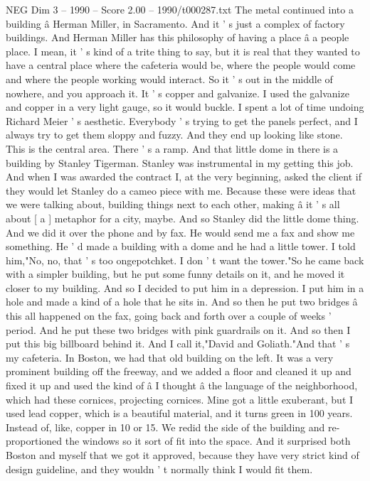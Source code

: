 \begin{textsample}{NEG Dim 3 – 1990 – Score 2.00 – 1990/t000287.txt}
The metal continued into a building â Herman Miller, in Sacramento.
And it ' s just a complex of factory buildings.
And Herman Miller has this philosophy of having a place â a people place.
I mean, it ' s kind of a trite thing to say, but it is real that they wanted to have a central place where the cafeteria would be, where the people would come and where the people working would interact.
So it ' s out in the middle of nowhere, and you approach it.
It ' s copper and galvanize.
I used the galvanize and copper in a very light gauge, so it would buckle.
I spent a lot of time undoing Richard Meier ' s aesthetic.
Everybody ' s trying to get the panels perfect, and I always try to get them sloppy and fuzzy.
And they end up looking like stone.
This is the central area.
There ' s a ramp.
And that little dome in there is a building by Stanley Tigerman.
Stanley was instrumental in my getting this job.
And when I was awarded the contract I, at the very beginning, asked the client if they would let Stanley do a cameo piece with me.
Because these were ideas that we were talking about, building things next to each other, making â it ' s all about [ a ] metaphor for a city, maybe.
And so Stanley did the little dome thing.
And we did it over the phone and by fax.
He would send me a fax and show me something.
He ' d made a building with a dome and he had a little tower.
I told him,"No, no, that ' s too ongepotchket.
I don ' t want the tower."So he came back with a simpler building, but he put some funny details on it, and he moved it closer to my building.
And so I decided to put him in a depression.
I put him in a hole and made a kind of a hole that he sits in.
And so then he put two bridges â this all happened on the fax, going back and forth over a couple of weeks ' period.
And he put these two bridges with pink guardrails on it.
And so then I put this big billboard behind it.
And I call it,"David and Goliath."And that ' s my cafeteria.
In Boston, we had that old building on the left.
It was a very prominent building off the freeway, and we added a floor and cleaned it up and fixed it up and used the kind of â I thought â the language of the neighborhood, which had these cornices, projecting cornices.
Mine got a little exuberant, but I used lead copper, which is a beautiful material, and it turns green in 100 years.
Instead of, like, copper in 10 or 15.
We redid the side of the building and re-proportioned the windows so it sort of fit into the space.
And it surprised both Boston and myself that we got it approved, because they have very strict kind of design guideline, and they wouldn ' t normally think I would fit them.

\end{textsample}
